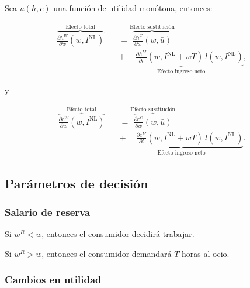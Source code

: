 \documentclass[8pt,a4paper]{extarticle}
\begin{document}
\begin{multicols}{3}
\begin{boxtheo}
	Sea $u(h, c)$ una función de utilidad monótona, entonces:
	
	\begin{equation*}
	\begin{aligned}
		\overbrace{\frac{\partial h^W}{\partial w} (w, I^{\text{NL}})}^{\text{Efecto total}} \quad &= \overbrace{\frac{\partial h^C}{\partial w} (w, \bar{u})}^{\text{Efecto sustitución}} \\
																						   & \underbrace{ + \quad\ \frac{\partial h^M}{\partial l} (w, I^{\text{NL}} + wT)\ l (w, I^{\text{NL}})}_{\text{Efecto ingreso neto}},
	\end{aligned}
	\end{equation*}
	
	y
	
	\begin{equation*}
	\begin{aligned}
		\overbrace{\frac{\partial c^W}{\partial w} (w, I^{\text{NL}})}^{\text{Efecto total}} \quad &= \overbrace{\frac{\partial c^C}{\partial w} (w, \bar{u})}^{\text{Efecto sustitución}} \\
																						   & \underbrace{ + \quad\ \frac{\partial c^M}{\partial l} (w, I^{\text{NL}} + wT)\ l (w, I^{\text{NL}})}_{\text{Efecto ingreso neto}}.
	\end{aligned}
	\end{equation*}
\end{boxtheo}

\sectionbreak

\subsection{Parámetros de decisión}

\subsubsection*{Salario de reserva}

\begin{eqlist}
\item Si $ w^R < w $, entonces el consumidor decidirá trabajar.
\item Si $ w^R > w $, entonces el consumidor demandará $T$ horas al ocio.
\end{eqlist}

\subsubsection*{Cambios en utilidad}


\end{multicols}
\end{document}
